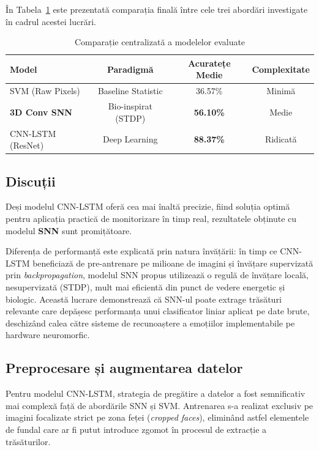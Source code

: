 În Tabela~\ref{tab:sinteza_finala} este prezentată comparația finală între cele trei abordări investigate în cadrul acestei lucrări.

\begin{table}[h!]
	\centering
	\caption{Comparație centralizată a modelelor evaluate}
	\label{tab:sinteza_finala}
	\begin{tabular}{lccc}
		\toprule
		\textbf{Model} & \textbf{Paradigmă} & \textbf{Acuratețe Medie} & \textbf{Complexitate} \\ \midrule
		SVM (Raw Pixels) & Baseline Statistic & 36.57\% & Minimă \\
		\textbf{3D Conv SNN} & Bio-inspirat (STDP) & \textbf{56.10\%} & Medie \\
		CNN-LSTM (ResNet) & Deep Learning & \textbf{88.37\%} & Ridicată \\ \bottomrule
	\end{tabular}
\end{table}

\subsection*{Discuții}
Deși modelul CNN-LSTM oferă cea mai înaltă precizie, fiind soluția optimă pentru aplicația practică de monitorizare în timp real, rezultatele obținute cu modelul \textbf{SNN} sunt promițătoare. 

Diferența de performanță este explicată prin natura învățării: în timp ce CNN-LSTM beneficiază de pre-antrenare pe milioane de imagini și învățare supervizată prin \textit{backpropagation}, modelul SNN propus utilizează o regulă de învățare locală, nesupervizată (STDP), mult mai eficientă din punct de vedere energetic și biologic. Această lucrare demonstrează că SNN-ul poate extrage trăsături relevante care depășesc performanța unui clasificator liniar aplicat pe date brute, deschizând calea către sisteme de recunoaștere a emoțiilor implementabile pe hardware neuromorfic.

\subsection*{Preprocesare și augmentarea datelor}

Pentru modelul CNN-LSTM, strategia de pregătire a datelor a fost semnificativ mai complexă față de abordările SNN și SVM. Antrenarea s-a realizat exclusiv pe imagini focalizate strict pe zona feței (\textit{cropped faces}), eliminând astfel elementele de fundal care ar fi putut introduce zgomot în procesul de extracție a trăsăturilor.

